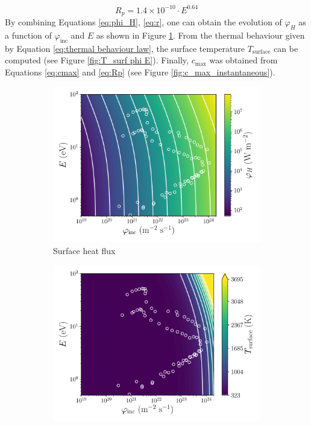 \begin{equation}
    R_p = 1.4\times 10 ^{-10}\cdot E^{0.64}
    \label{eq:Rp}
\end{equation}
By combining Equations \ref{eq:phi_H}, \ref{eq:r}, one can obtain the evolution of $\varphi_H$ as a function of $\varphi_\mathrm{inc}$ and $E$ as shown in Figure \ref{fig:phi_H phi E}.
From the thermal behaviour given by Equation \ref{eq:thermal behaviour law}, the surface temperature $T_\mathrm{surface}$ can be computed (see Figure \ref{fig:T_surf phi E}).
Finally, $c_\mathrm{max}$ was obtained from Equations \ref{eq:cmax} and \ref{eq:Rp} (see Figure \ref{fig:c_max_instantaneous}).

\begin{figure} [ht]
    \centering
    \begin{subfigure}{0.5\linewidth}
        \centering
        \includegraphics[width=\linewidth]{Figures/Chapter3/monoblocks/parametric_study/phi_H_phi_E.pdf}
        \caption{Surface heat flux}
        \label{fig:phi_H phi E}
    \end{subfigure}%
    \begin{subfigure}{0.5\linewidth}
        \centering
        \includegraphics[width=\linewidth]{Figures/Chapter3/monoblocks/parametric_study/T_phi_E.pdf}

\end{subfigure}
\end{figure}
